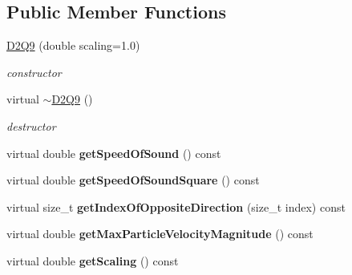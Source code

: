 \subsection*{Public Member Functions}
\begin{DoxyCompactItemize}
\item 
\hypertarget{classnatrium_1_1D2Q9_aefc2ad7c8e9bd1899b57f84e767054ce}{
\hyperlink{classnatrium_1_1D2Q9_aefc2ad7c8e9bd1899b57f84e767054ce}{D2Q9} (double scaling=1.0)}
\label{classnatrium_1_1D2Q9_aefc2ad7c8e9bd1899b57f84e767054ce}

\begin{DoxyCompactList}\small\item\em constructor \item\end{DoxyCompactList}\item 
\hypertarget{classnatrium_1_1D2Q9_a230cf346935461c171fc0fc64f80a460}{
virtual \hyperlink{classnatrium_1_1D2Q9_a230cf346935461c171fc0fc64f80a460}{$\sim$D2Q9} ()}
\label{classnatrium_1_1D2Q9_a230cf346935461c171fc0fc64f80a460}

\begin{DoxyCompactList}\small\item\em destructor \item\end{DoxyCompactList}\item 
\hypertarget{classnatrium_1_1D2Q9_a6644a084f33923d6c0a0b7bbf2460f07}{
virtual double {\bfseries getSpeedOfSound} () const }
\label{classnatrium_1_1D2Q9_a6644a084f33923d6c0a0b7bbf2460f07}

\item 
\hypertarget{classnatrium_1_1D2Q9_a4c43f059b0215859aefcd2005bbbd87e}{
virtual double {\bfseries getSpeedOfSoundSquare} () const }
\label{classnatrium_1_1D2Q9_a4c43f059b0215859aefcd2005bbbd87e}

\item 
\hypertarget{classnatrium_1_1D2Q9_afc9d7407013fd2d3ac911c2e4d3abffc}{
virtual size\_\-t {\bfseries getIndexOfOppositeDirection} (size\_\-t index) const }
\label{classnatrium_1_1D2Q9_afc9d7407013fd2d3ac911c2e4d3abffc}

\item 
\hypertarget{classnatrium_1_1D2Q9_a31ff0889ea8be12f7189a85de0de897b}{
virtual double {\bfseries getMaxParticleVelocityMagnitude} () const }
\label{classnatrium_1_1D2Q9_a31ff0889ea8be12f7189a85de0de897b}

\item 
\hypertarget{classnatrium_1_1D2Q9_ac794c870702f65d5a0b2f86549f82773}{
virtual double {\bfseries getScaling} () const }
\label{classnatrium_1_1D2Q9_ac794c870702f65d5a0b2f86549f82773}

\end{DoxyCompactItemize}

